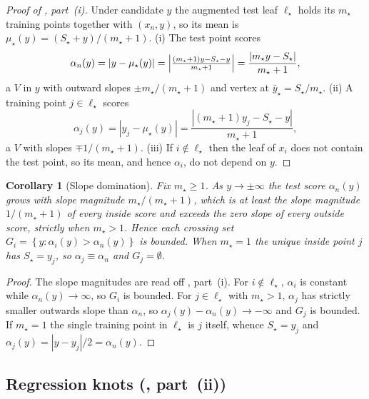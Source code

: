 \documentclass[twoside]{article}
\numberwithin{equation}{section}
\theoremstyle{plain}
\newtheorem{corollary}[theorem]{Corollary}
\theoremstyle{definition}
\theoremstyle{remark}
\newcommand{\set}[1]{\left\{#1\right\}}
\newcommand{\abs}[1]{\left\lvert #1 \right\rvert}
\begin{document}
\begin{proof}[Proof of , part~(i)]
Under candidate $y$ the augmented test leaf $\ell_\star$ holds its $m_\star$ training
points together with $(x_n, y)$, so its mean is $\mu_\star(y) = (S_\star + y)/(m_\star + 1)$.
\textup{(i)} The test point scores
\[
  \alpha_n(y) = \abs{y - \mu_\star(y)}
    = \Bigl\lvert \tfrac{(m_\star+1)y - S_\star - y}{m_\star+1} \Bigr\rvert
    = \frac{\abs{m_\star y - S_\star}}{m_\star + 1},
\]
a $V$ in $y$ with outward slopes $\pm m_\star/(m_\star+1)$ and vertex at $\bar{y}_\star = S_\star/m_\star$.
\textup{(ii)} A training point $j \in \ell_\star$ scores
\[
  \alpha_j(y) = \abs{y_j - \mu_\star(y)}
    = \frac{\abs{(m_\star+1)y_j - S_\star - y}}{m_\star + 1},
\]
a $V$ with slopes $\mp 1/(m_\star+1)$. \textup{(iii)} If $i \notin \ell_\star$ then the
leaf of $x_i$ does not contain the test point, so its mean, and hence $\alpha_i$, do not
depend on $y$.
\end{proof}

\begin{corollary}[Slope domination]\label{cor:slope}
Fix $m_\star \ge 1$. As $y \to \pm\infty$ the test score $\alpha_n(y)$ grows with slope
magnitude $m_\star/(m_\star+1)$, which is at least the slope magnitude $1/(m_\star+1)$ of
every inside score and exceeds the zero slope of every outside score, strictly when
$m_\star > 1$. Hence each crossing set $G_i = \set{y : \alpha_i(y) > \alpha_n(y)}$ is
bounded. When $m_\star = 1$ the unique inside point $j$ has $S_\star = y_j$, so
$\alpha_j \equiv \alpha_n$ and $G_j = \emptyset$.
\end{corollary}

\begin{proof}
The slope magnitudes are read off , part~(i). For $i \notin \ell_\star$,
$\alpha_i$ is constant while $\alpha_n(y) \to \infty$, so $G_i$ is bounded. For
$j \in \ell_\star$ with $m_\star > 1$, $\alpha_j$ has strictly smaller outwards slope than
$\alpha_n$, so $\alpha_j(y) - \alpha_n(y) \to -\infty$ and $G_j$ is bounded. If
$m_\star = 1$ the single training point in $\ell_\star$ is $j$ itself, whence
$S_\star = y_j$ and $\alpha_j(y) = \abs{y - y_j}/2 = \alpha_n(y)$.
\end{proof}

\subsection{Regression knots (, part~(ii))}\label{app:reg-knots}
\end{document}
